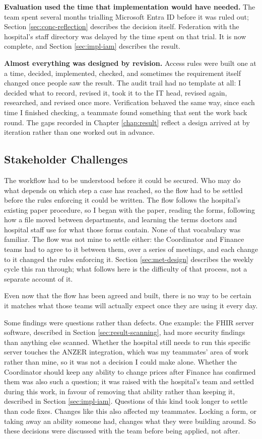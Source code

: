 \textbf{Evaluation used the time that implementation would have needed.} The team spent several months trialling Microsoft Entra ID before it was ruled out; Section \ref{sec:conc-reflection} describes the decision itself. Federation with the hospital's staff directory was delayed by the time spent on that trial. It is now complete, and Section \ref{sec:impl-iam} describes the result.

\textbf{Almost everything was designed by revision.} Access rules were built one at a time, decided, implemented, checked, and sometimes the requirement itself changed once people saw the result. The audit trail had no template at all: I decided what to record, revised it, took it to the IT head, revised again, researched, and revised once more. Verification behaved the same way, since each time I finished checking, a teammate found something that sent the work back round. The gaps recorded in Chapter \ref{chap:result} reflect a design arrived at by iteration rather than one worked out in advance.

\subsection{Stakeholder Challenges}

The workflow had to be understood before it could be secured. Who may do what depends on which step a case has reached, so the flow had to be settled before the rules enforcing it could be written. The flow follows the hospital's existing paper procedure, so I began with the paper, reading the forms, following how a file moved between departments, and learning the terms doctors and hospital staff use for what those forms contain. None of that vocabulary was familiar. The flow was not mine to settle either: the Coordinator and Finance teams had to agree to it between them, over a series of meetings, and each change to it changed the rules enforcing it. Section \ref{sec:met-design} describes the weekly cycle this ran through; what follows here is the difficulty of that process, not a separate account of it.

Even now that the flow has been agreed and built, there is no way to be certain it matches what those teams will actually expect once they are using it every day.

Some findings were questions rather than defects. One example: the FHIR server software, described in Section \ref{sec:result-scanning}, had more security findings than anything else scanned. Whether the hospital still needs to run this specific server touches the ANZER integration, which was my teammates' area of work rather than mine, so it was not a decision I could make alone. Whether the Coordinator should keep any ability to change prices after Finance has confirmed them was also such a question; it was raised with the hospital's team and settled during this work, in favour of removing that ability rather than keeping it, described in Section \ref{sec:impl-iam}. Questions of this kind took longer to settle than code fixes. Changes like this also affected my teammates. Locking a form, or taking away an ability someone had, changes what they were building around. So these decisions were discussed with the team before being applied, not after.

